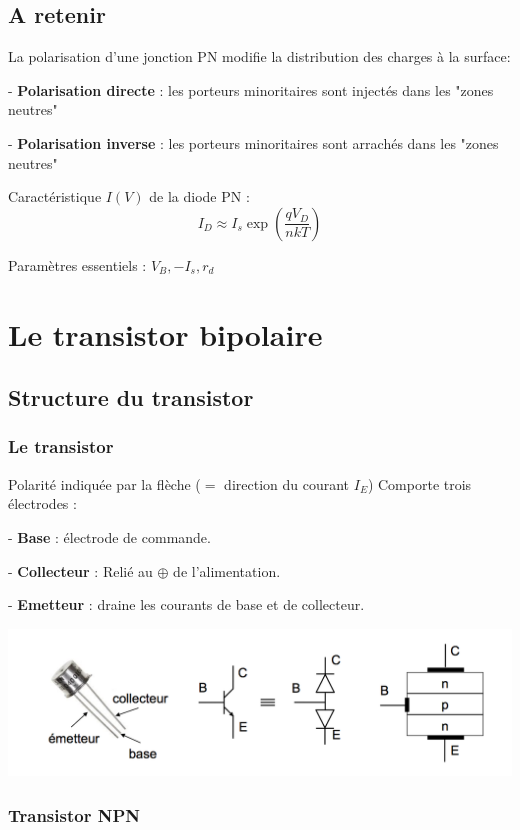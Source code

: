 \documentclass[]{article}
\begin{document}
\subsection{A retenir}

La polarisation d'une jonction PN modifie la distribution des charges à la surface:

-  \textbf{Polarisation directe} : les porteurs minoritaires sont injectés dans les "zones neutres"

- \textbf{Polarisation inverse} : les porteurs minoritaires sont arrachés dans les "zones neutres"

Caractéristique $I(V)$ de la diode PN : $$ I_D \approx I_s \exp{(\frac{qV_D}{nkT})} $$

Paramètres essentiels : $V_B , - I_s, r_d$

\section{Le transistor bipolaire}
\subsection{Structure du transistor}
\subsubsection{Le transistor}
Polarité indiquée par la flèche ($=$ direction du courant $I_E$)
Comporte trois électrodes :

- \textbf{Base} : électrode de commande.

- \textbf{Collecteur} : Relié au $\oplus$ de l'alimentation.

- \textbf{Emetteur} : draine les courants de base et de collecteur.

\includegraphics[scale=0.6]{transistor.png} 

\subsubsection{Transistor NPN}
\end{document}
